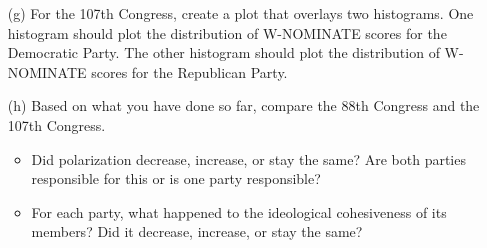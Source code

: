 \documentclass[12pt,letterpaper]{article}
\begin{document}
\begin{itemize}
\item[(g)]  
For the 107th Congress, create a plot that overlays two histograms. One histogram should plot the distribution of W-NOMINATE scores for the Democratic Party. The other histogram should plot the distribution of W-NOMINATE scores for the Republican Party. \\

\item[(h)] 
Based on what you have done so far, compare the 88th Congress and the 107th Congress.

\begin{itemize}
\item Did polarization decrease, increase, or stay the same? Are both parties responsible for this or is one party responsible? \\


\item For each party, what happened to the ideological cohesiveness of its members? Did it decrease, increase, or stay the same?\\



\end{itemize}



\end{itemize}
\end{document}
